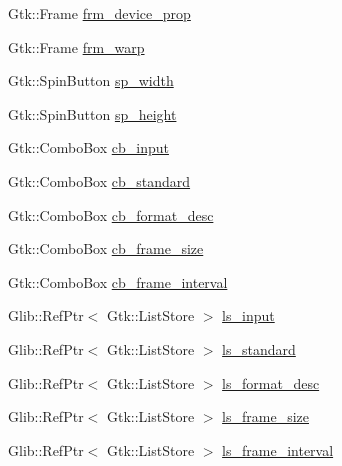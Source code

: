 \begin{DoxyCompactItemize}
\item 
Gtk\+::\+Frame \hyperlink{class_v_s_s_s___g_u_i_1_1_v4_l_interface_a5f4e313c287e18402de5918558a3f33e}{frm\+\_\+device\+\_\+prop}
\item 
Gtk\+::\+Frame \hyperlink{class_v_s_s_s___g_u_i_1_1_v4_l_interface_af5db2099d80d5ef2fcc1d97417e6ce72}{frm\+\_\+warp}
\item 
Gtk\+::\+Spin\+Button \hyperlink{class_v_s_s_s___g_u_i_1_1_v4_l_interface_a0f492cb2c65c4021c9b9b81f4a185e84}{sp\+\_\+width}
\item 
Gtk\+::\+Spin\+Button \hyperlink{class_v_s_s_s___g_u_i_1_1_v4_l_interface_a7b095a3a9dc7a5895f3bac68b05b8210}{sp\+\_\+height}
\item 
Gtk\+::\+Combo\+Box \hyperlink{class_v_s_s_s___g_u_i_1_1_v4_l_interface_af7c647eefb3e6f7cf8e0fdc170619922}{cb\+\_\+input}
\item 
Gtk\+::\+Combo\+Box \hyperlink{class_v_s_s_s___g_u_i_1_1_v4_l_interface_ae78aa74f420bbb92b59ff0e0f0ac3b1e}{cb\+\_\+standard}
\item 
Gtk\+::\+Combo\+Box \hyperlink{class_v_s_s_s___g_u_i_1_1_v4_l_interface_a1f6b2f08ccbc0ecbfba96311ac07aa44}{cb\+\_\+format\+\_\+desc}
\item 
Gtk\+::\+Combo\+Box \hyperlink{class_v_s_s_s___g_u_i_1_1_v4_l_interface_ad6dd4704d3b7d1f262843dd148269b73}{cb\+\_\+frame\+\_\+size}
\item 
Gtk\+::\+Combo\+Box \hyperlink{class_v_s_s_s___g_u_i_1_1_v4_l_interface_ad07b3bbad672e676e128f19a12f07e73}{cb\+\_\+frame\+\_\+interval}
\item 
Glib\+::\+Ref\+Ptr$<$ Gtk\+::\+List\+Store $>$ \hyperlink{class_v_s_s_s___g_u_i_1_1_v4_l_interface_aa75d8bcb0eb63a56329ab95ad9cc4059}{ls\+\_\+input}
\item 
Glib\+::\+Ref\+Ptr$<$ Gtk\+::\+List\+Store $>$ \hyperlink{class_v_s_s_s___g_u_i_1_1_v4_l_interface_a063413bdff6e830d30b1e29a869d0d56}{ls\+\_\+standard}
\item 
Glib\+::\+Ref\+Ptr$<$ Gtk\+::\+List\+Store $>$ \hyperlink{class_v_s_s_s___g_u_i_1_1_v4_l_interface_af84894601f7c0cc60854344efdb38558}{ls\+\_\+format\+\_\+desc}
\item 
Glib\+::\+Ref\+Ptr$<$ Gtk\+::\+List\+Store $>$ \hyperlink{class_v_s_s_s___g_u_i_1_1_v4_l_interface_ac3e4431f229b53c83e35f5f400f4afee}{ls\+\_\+frame\+\_\+size}
\item 
Glib\+::\+Ref\+Ptr$<$ Gtk\+::\+List\+Store $>$ \hyperlink{class_v_s_s_s___g_u_i_1_1_v4_l_interface_a91944c46bd07555790f773506a4bcf4c}{ls\+\_\+frame\+\_\+interval}
\item 

\end{DoxyCompactItemize}

